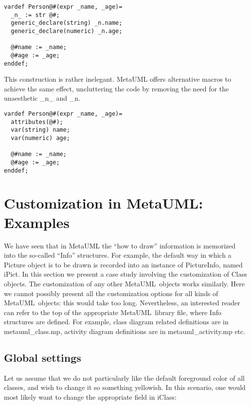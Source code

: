 \documentclass{article}
\newcommand{\code}{\ttfamily}
\newcommand{\metauml}{MetaUML}
\begin{document}
\begin{verbatim}
vardef Person@#(expr _name, _age)=
  _n_ := str @#;
  generic_declare(string) _n.name;
  generic_declare(numeric) _n.age;

  @#name := _name;
  @#age := _age;
enddef;
\end{verbatim}

This construction is rather inelegant. MetaUML offers alternative macros to achieve
the same effect, uncluttering the code by removing the need for the unaesthetic {\code \_n\_} and
{\code \_n}.

\begin{verbatim}
vardef Person@#(expr _name, _age)=
  attributes(@#);
  var(string) name;
  var(numeric) age;

  @#name := _name;
  @#age := _age;
enddef;
\end{verbatim}

\section{Customization in MetaUML: Examples}
\label{section:customization}

We have seen that in MetaUML the ``how to draw'' information is memorized into the so-called
``{\code Info}'' structures. For example, the default way in which a {\code Picture} object is
to be drawn is recorded into an instance of {\code PictureInfo}, named {\code iPict}. In this section we
present a case study involving the customization of {\code Class} objects. The customization of
any other \metauml\ objects works similarly. Here we cannot possibly present all the customization
options for all kinds of \metauml\ objects: this would take too long. Nevertheless, an interested reader can refer
to the top of the appropriate \metauml\ library file, where {\code Info} structures are defined.
For example, class diagram related definitions are in {\code metauml\_class.mp}, activity diagram
definitions are in {\code metauml\_activity.mp} etc.

\subsection{Global settings}

Let us assume that we do not particularly like the default foreground color of all classes, and wish
to change it so something yellowish. In this scenario, one would most likely want to change
the appropriate field in {\code iClass}:
\end{document}
